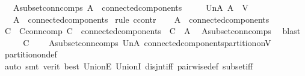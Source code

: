 \begin{isabellebody}
\ \ \ A{\isacharunderscore}{\kern0pt}subset{\isacharunderscore}{\kern0pt}conn{\isacharunderscore}{\kern0pt}comps{\isacharcolon}{\kern0pt}\ {\isachardoublequoteopen}A\ {\isasymsubseteq}\ connected{\isacharunderscore}{\kern0pt}components{\isachardoublequoteclose}\isanewline
\ \ \ \ \ Un{\isacharunderscore}{\kern0pt}A{\isacharcolon}{\kern0pt}\ {\isachardoublequoteopen}{\isasymUnion}A\ {\isacharequal}{\kern0pt}\ V{\isachardoublequoteclose}\isanewline
\ \ \ {\isachardoublequoteopen}A\ {\isacharequal}{\kern0pt}\ connected{\isacharunderscore}{\kern0pt}components{\isachardoublequoteclose}\isanewline
%
\isadelimproof
%
\endisadelimproof
%
\isatagproof
{}\isamarkupfalse%
\ {\isacharparenleft}{\kern0pt}rule\ ccontr{\isacharparenright}{\kern0pt}\isanewline
\ \ \isamarkupfalse%
\ {\isachardoublequoteopen}A\ {\isasymnoteq}\ connected{\isacharunderscore}{\kern0pt}components{\isachardoublequoteclose}\isanewline
\ \ \isamarkupfalse%
\ \isamarkupfalse%
\ C\ \ C{\isacharunderscore}{\kern0pt}conn{\isacharunderscore}{\kern0pt}comp{\isacharcolon}{\kern0pt}\ {\isachardoublequoteopen}C\ {\isasymin}\ connected{\isacharunderscore}{\kern0pt}components\ {\isachardoublequoteclose}\ {\isachardoublequoteopen}C\ {\isasymnotin}\ A{\isachardoublequoteclose}\ \isamarkupfalse%
\ A{\isacharunderscore}{\kern0pt}subset{\isacharunderscore}{\kern0pt}conn{\isacharunderscore}{\kern0pt}comps\ \isamarkupfalse%
\ blast\isanewline
\ \ \isamarkupfalse%
\ \isamarkupfalse%
\ {\isachardoublequoteopen}C\ {\isacharequal}{\kern0pt}\ {\isacharbraceleft}{\kern0pt}{\isacharbraceright}{\kern0pt}{\isachardoublequoteclose}\ \isamarkupfalse%
\ A{\isacharunderscore}{\kern0pt}subset{\isacharunderscore}{\kern0pt}conn{\isacharunderscore}{\kern0pt}comps\ Un{\isacharunderscore}{\kern0pt}A\ connected{\isacharunderscore}{\kern0pt}components{\isacharunderscore}{\kern0pt}partition{\isacharunderscore}{\kern0pt}on{\isacharunderscore}{\kern0pt}V\ \isamarkupfalse%
\ partition{\isacharunderscore}{\kern0pt}on{\isacharunderscore}{\kern0pt}def\isanewline
\ \ \ \ \isamarkupfalse%
\ {\isacharparenleft}{\kern0pt}auto{\isacharcomma}{\kern0pt}\ smt\ {\isacharparenleft}{\kern0pt}verit{\isacharcomma}{\kern0pt}\ best{\isacharparenright}{\kern0pt}\ UnionE\ UnionI\ disjnt{\isacharunderscore}{\kern0pt}iff\ pairwise{\isacharunderscore}{\kern0pt}def\ subset{\isacharunderscore}{\kern0pt}iff{\isacharparenright}{\kern0pt}\isanewline

\end{isabellebody}
